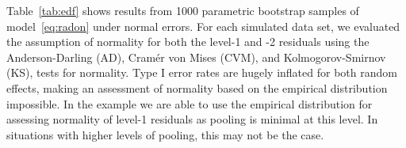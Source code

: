 \documentclass{article} %
\begin{document}
Table~\ref{tab:edf} shows results from 1000 parametric bootstrap samples of model~\eqref{eq:radon} under normal errors.
For each simulated data set, we evaluated the assumption of normality for both the level-1 and -2 residuals using the Anderson-Darling (AD), Cram{\'e}r von Mises (CVM), and  Kolmogorov-Smirnov (KS), tests for normality.  
Type I error rates are hugely inflated for both random effects, making an assessment of normality based on the empirical distribution impossible.
In the example we are able to use  the empirical distribution for assessing normality of  level-1 residuals  as  pooling is minimal at this level. In situations with higher levels of pooling, this may not be the case.
\end{document}
